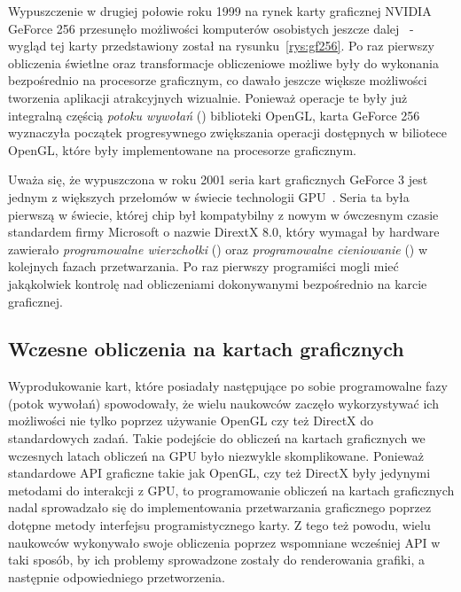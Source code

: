 Wypuszczenie w drugiej połowie roku 1999 na rynek karty graficznej NVIDIA GeForce 256 przesunęło możliwości komputerów osobistych jeszcze dalej~\cite{nvidia:geforce256} - wygląd tej karty przedstawiony został na rysunku~\ref{rys:gf256}. Po raz pierwszy obliczenia świetlne oraz transformacje obliczeniowe możliwe były do wykonania bezpośrednio na procesorze graficznym, co dawało jeszcze większe możliwości tworzenia aplikacji atrakcyjnych wizualnie. Ponieważ operacje te były już integralną częścią \emph{potoku wywołań} () biblioteki OpenGL, karta GeForce 256 wyznaczyła początek progresywnego zwiększania operacji dostępnych w biliotece OpenGL, które były implementowane na procesorze graficznym.

Uważa się, że wypuszczona w roku 2001 seria kart graficznych GeForce 3 jest jednym z większych przełomów w świecie technologii GPU~\cite{nvidia:geforce3,Cuda:Example}. Seria ta była pierwszą w świecie, której chip był kompatybilny z nowym w ówczesnym czasie standardem firmy Microsoft o nazwie DirextX 8.0, który wymagał by hardware zawierało \emph{programowalne wierzchołki} () oraz \emph{programowalne cieniowanie} () w kolejnych fazach przetwarzania. Po raz pierwszy programiści mogli mieć jakąkolwiek kontrolę nad obliczeniami dokonywanymi bezpośrednio na karcie graficznej.

\subsection{Wczesne obliczenia na kartach graficznych}
\label{chapter:wczesne}

Wyprodukowanie kart, które posiadały następujące po sobie programowalne fazy (potok wywołań) spowodowały, że wielu naukowców zaczęło wykorzystywać ich możliwości nie tylko poprzez używanie OpenGL czy też DirectX do standardowych zadań. Takie podejście do obliczeń na kartach graficznych we wczesnych latach obliczeń na GPU było niezwykle skomplikowane. Ponieważ standardowe API graficzne takie jak OpenGL, czy też DirectX były jedynymi metodami do interakcji z GPU, to programowanie obliczeń na kartach graficznych nadal sprowadzało się do implementowania przetwarzania graficznego poprzez dotępne metody interfejsu programistycznego karty. Z tego też powodu, wielu naukowców wykonywało swoje obliczenia poprzez wspomniane wcześniej API w taki sposób, by ich problemy sprowadzone zostały do renderowania grafiki, a następnie odpowiedniego przetworzenia.


